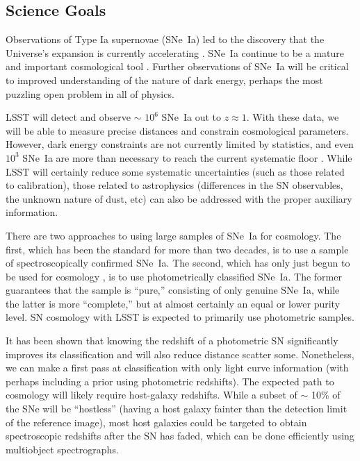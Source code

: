 \subsection{Science Goals}

Observations of Type Ia supernovae (SNe~Ia) led to the discovery that
the Universe's expansion is currently accelerating
\citep{Riess98:Lambda, Perlmutter99}.  SNe~Ia continue to be a mature
and important cosmological tool \citep[e.g.,][]{Suzuki12, Betoule14,
Rest14}.  Further observations of SNe~Ia will be critical to
improved understanding of the nature of dark energy, perhaps the most
puzzling open problem in all of physics.

LSST will detect and observe $\sim$ $10^{6}$ SNe~Ia out to $z \approx
1$.  With these data, we will be able to measure precise distances and
constrain cosmological parameters.  However, dark energy constraints
are not currently limited by statistics, and even $10^{3}$ SNe~Ia are
more than necessary to reach the current systematic floor
\citep{Betoule14, Scolnic14:ps1}.  While LSST will certainly reduce
some systematic uncertainties (such as those related to calibration),
those related to astrophysics (differences in the SN observables, the
unknown nature of dust, etc) can also be addressed with the proper
auxiliary information.

There are two approaches to using large samples of SNe~Ia for
cosmology.  The first, which has been the standard for more than two
decades, is to use a sample of spectroscopically confirmed SNe~Ia.
The second, which has only just begun to be used for cosmology
\citep{Campbell13}, is to use photometrically classified SNe~Ia.  The
former guarantees that the sample is ``pure,'' consisting of only
genuine SNe~Ia, while the latter is more ``complete,'' but at almost
certainly an equal or lower purity level.  SN
cosmology with LSST is expected to primarily use photometric samples.

It has been shown that knowing the redshift of a photometric SN significantly
improves its classification and will also reduce distance scatter
some.  Nonetheless, we can make a first pass at classification with
only light curve information (with perhaps including a prior using
photometric redshifts).  The expected path to cosmology will likely
require host-galaxy redshifts.  While a subset of $\sim$ 10\% of the
SNe will be ``hostless'' (having a host galaxy fainter than the
detection limit of the reference image), most host galaxies could be
targeted to obtain spectroscopic redshifts after the SN has faded, which can be done efficiently using multiobject spectrographs.  

